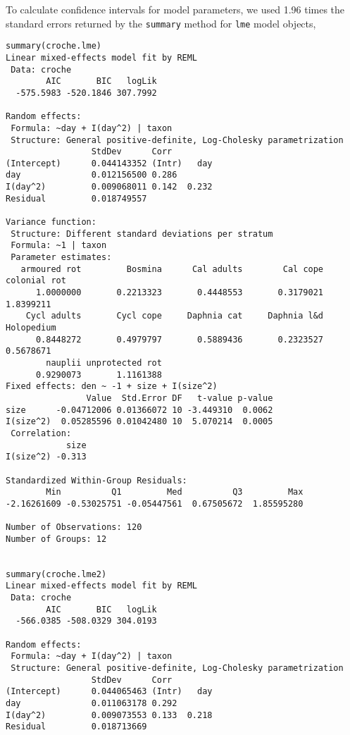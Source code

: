 \documentclass[12pt]{ecologyFORAPPENDIX}
\begin{document}
To calculate confidence intervals for model parameters, we used 1.96 times the standard errors returned by the \texttt{summary} method for \texttt{lme} model objects,
\vspace{-16pt}
\singlespace 
\begin{verbatim}
summary(croche.lme)
Linear mixed-effects model fit by REML
 Data: croche 
        AIC       BIC   logLik
  -575.5983 -520.1846 307.7992

Random effects:
 Formula: ~day + I(day^2) | taxon
 Structure: General positive-definite, Log-Cholesky parametrization
                 StdDev      Corr         
(Intercept)      0.044143352 (Intr)   day
day              0.012156500 0.286        
I(day^2)         0.009068011 0.142  0.232 
Residual         0.018749557              

Variance function:
 Structure: Different standard deviations per stratum
 Formula: ~1 | taxon 
 Parameter estimates:
   armoured rot         Bosmina      Cal adults        Cal cope    colonial rot 
      1.0000000       0.2213323       0.4448553       0.3179021       1.8399211 
    Cycl adults       Cycl cope     Daphnia cat     Daphnia l&d      Holopedium 
      0.8448272       0.4979797       0.5889436       0.2323527       0.5678671 
        nauplii unprotected rot 
      0.9290073       1.1161388 
Fixed effects: den ~ -1 + size + I(size^2) 
                Value  Std.Error DF   t-value p-value
size      -0.04712006 0.01366072 10 -3.449310  0.0062
I(size^2)  0.05285596 0.01042480 10  5.070214  0.0005
 Correlation: 
            size
I(size^2) -0.313

Standardized Within-Group Residuals:
        Min          Q1         Med          Q3         Max 
-2.16261609 -0.53025751 -0.05447561  0.67505672  1.85595280 

Number of Observations: 120
Number of Groups: 12 


summary(croche.lme2)
Linear mixed-effects model fit by REML
 Data: croche
        AIC       BIC   logLik
  -566.0385 -508.0329 304.0193

Random effects:
 Formula: ~day + I(day^2) | taxon
 Structure: General positive-definite, Log-Cholesky parametrization
                 StdDev      Corr         
(Intercept)      0.044065463 (Intr)   day
day              0.011063178 0.292        
I(day^2)         0.009073553 0.133  0.218 
Residual         0.018713669              


\end{verbatim}
\end{document}
